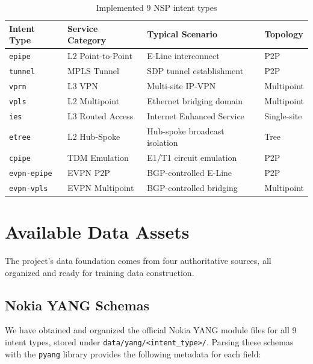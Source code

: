 \documentclass[12pt, a4paper]{article}
\newcommand{\intenttype}[1]{\texttt{#1}}
\newcommand{\filepath}[1]{\texttt{#1}}
\newcommand{\yang}{\textsc{YANG}}
\begin{document}
\begin{table}[H]
\centering
\caption{Implemented 9 NSP intent types}
\label{tab:intent-types}
\small
\begin{tabular}{llll}
\toprule
\textbf{Intent Type} & \textbf{Service Category} & \textbf{Typical Scenario} & \textbf{Topology} \\
\midrule
\intenttype{epipe}       & L2 Point-to-Point & E-Line interconnect         & P2P \\
\intenttype{tunnel}      & MPLS Tunnel        & SDP tunnel establishment    & P2P \\
\intenttype{vprn}        & L3 VPN             & Multi-site IP-VPN           & Multipoint \\
\intenttype{vpls}        & L2 Multipoint      & Ethernet bridging domain    & Multipoint \\
\intenttype{ies}         & L3 Routed Access   & Internet Enhanced Service   & Single-site \\
\intenttype{etree}       & L2 Hub-Spoke       & Hub-spoke broadcast isolation & Tree \\
\intenttype{cpipe}       & TDM Emulation      & E1/T1 circuit emulation     & P2P \\
\intenttype{evpn-epipe}  & EVPN P2P           & BGP-controlled E-Line       & P2P \\
\intenttype{evpn-vpls}   & EVPN Multipoint    & BGP-controlled bridging     & Multipoint \\
\bottomrule
\end{tabular}
\end{table}

\section{Available Data Assets}
\label{sec:data-assets}

The project's data foundation comes from four authoritative sources, all organized and ready for training data construction.

\subsection{Nokia YANG Schemas}

We have obtained and organized the official Nokia \yang{} module files for all 9 intent types, stored under \filepath{data/yang/<intent\_type>/}. Parsing these schemas with the \texttt{pyang} library provides the following metadata for each field:
\end{document}
